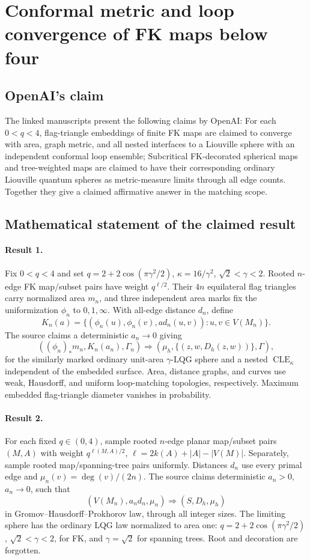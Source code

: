 \documentclass[11pt]{article}
\begin{document}
\section*{Conformal metric and loop convergence of FK maps below four}

\subsection{OpenAI's claim}
The linked manuscripts present the following claims by OpenAI: For each $0<q<4$, flag-triangle embeddings of finite FK maps are claimed to converge with area, graph metric, and all nested interfaces to a Liouville sphere with an independent conformal loop ensemble; Subcritical FK-decorated spherical maps and tree-weighted maps are claimed to have their corresponding ordinary Liouville quantum spheres as metric-measure limits through all edge counts. Together they give a claimed affirmative answer in the matching scope.

\subsection{Mathematical statement of the claimed result}
\paragraph{Result 1.} Fix \(0<q<4\) and set \(q=2+2\cos(\pi\gamma^2/2)\), \(\kappa=16/\gamma^2\), \(\sqrt2<\gamma<2\). Rooted \(n\)-edge FK map/subset pairs have weight \(q^{\ell/2}\). Their \(4n\) equilateral flag triangles carry normalized area \(m_n\), and three independent area marks fix the uniformization \(\phi_n\) to \(0,1,\infty\). With all-edge distance \(d_n\), define
\[
 K_n(a)=\{(\phi_n(u),\phi_n(v),a d_n(u,v)):u,v\in V(M_n)\}.
\]
The source claims a deterministic \(a_n\to0\) giving
\[
 ((\phi_n)_*m_n,K_n(a_n),\Gamma_n)
 \Longrightarrow(\mu_h,\{(z,w,D_h(z,w))\},\Gamma),
\]
for the similarly marked ordinary unit-area \(\gamma\)-LQG sphere and a nested \(\operatorname{CLE}_\kappa\) independent of the embedded surface. Area, distance graphs, and curves use weak, Hausdorff, and uniform loop-matching topologies, respectively. Maximum embedded flag-triangle diameter vanishes in probability.

\paragraph{Result 2.} For each fixed \(q\in(0,4)\), sample rooted \(n\)-edge planar map/subset pairs \((M,A)\) with weight \(q^{\ell(M,A)/2}\), \(\ell=2k(A)+|A|-|V(M)|\). Separately, sample rooted map/spanning-tree pairs uniformly. Distances \(d_n\) use every primal edge and \(\mu_n(v)=\deg(v)/(2n)\). The source claims deterministic \(a_n>0\), \(a_n\to0\), such that
\[
 (V(M_n),a_nd_n,\mu_n)\Longrightarrow(S,D_h,\mu_h)
\]
in Gromov--Hausdorff--Prokhorov law, through all integer sizes. The limiting sphere has the ordinary LQG law normalized to area one: \(q=2+2\cos(\pi\gamma^2/2)\), \(\sqrt2<\gamma<2\), for FK, and \(\gamma=\sqrt2\) for spanning trees. Root and decoration are forgotten.
\end{document}
